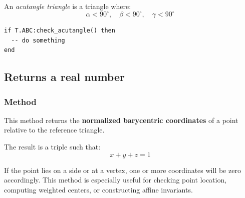 An \emph{acutangle triangle} is a triangle where:
\[
\alpha < 90^\circ, \quad \beta < 90^\circ, \quad \gamma < 90^\circ
\]


\begin{mybox}
\begin{verbatim}
if T.ABC:check_acutangle() then
  -- do something
end
\end{verbatim}
\end{mybox}





\subsection{Returns a real number}

\subsubsection{Method }
\label{ssub:_triangle_barycentric__coordinates_pt}

This method returns the \textbf{normalized barycentric coordinates} of a point relative to the reference triangle.

\begin{mybox}
\end{mybox}

\medskip

The result is a triple  such that:
\[
x + y + z = 1
\]

\medskip

If the point lies on a side or at a vertex, one or more coordinates will be zero accordingly. This method is especially useful for checking point location, computing weighted centers, or constructing affine invariants.

\vspace{1em}
\begin{minipage}{.45\textwidth}
  \let\tul\tkzUseLua
\end{minipage}
\begin{minipage}{.55\textwidth}
\begin{tkzexample}
\end{tkzexample}
\end{minipage}


